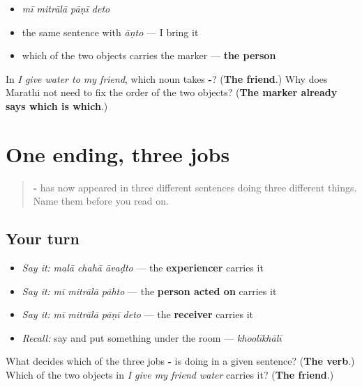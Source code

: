 \begin{itemize}
\raggedright
  \item \emph{mī mitrālā pāṇī deto}
  \item the same sentence with \emph{āṇto} — I bring it
  \item which of the two objects carries the marker — \textbf{the person}
\end{itemize}

\begin{tcolorbox}[breakable,colback=teal!4,colframe=teal!35!black,title={Before you move on}]
In \emph{I give water to my friend}, which noun takes \textbf{-}? (\textbf{The friend}.) Why does Marathi not need to fix the order of the two objects? (\textbf{The marker already says which is which}.)
\end{tcolorbox}
\section[\texorpdfstring{\mr{मित्राला} (mitrālā)}{मित्राला (mitrālā)}]{One ending, three jobs}

\label{lesson:MR-R47-give-it-to}



\begin{quote}
\textbf{-} has now appeared in three different sentences doing three different things. Name them before you read on.
\end{quote}

\subsection*{Your turn}
\begin{itemize}
\raggedright
  \item \emph{Say it:} \emph{malā chahā āvaḍto} — the \textbf{experiencer} carries it
  \item \emph{Say it:} \emph{mī mitrālā pāhto} — the \textbf{person acted on} carries it
  \item \emph{Say it:} \emph{mī mitrālā pāṇī deto} — the \textbf{receiver} carries it
  \item \emph{Recall:} say \textbf{} and put something under the room — \emph{khoolīkhālī}
\end{itemize}

\begin{tcolorbox}[breakable,colback=teal!4,colframe=teal!35!black,title={Before you move on}]
What decides which of the three jobs \textbf{-} is doing in a given sentence? (\textbf{The verb}.) Which of the two objects in \emph{I give my friend water} carries it? (\textbf{The friend}.)
\end{tcolorbox}
